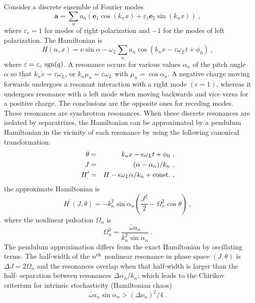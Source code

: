 \documentclass[12pt,a4paper]{article}
\renewcommand{\vec}[1]{\boldsymbol{#1}}
\begin{document}
Consider a discrete ensemble of Fourier modes
\begin{equation}
\vec{a} = \sum_n a_n(\vec{e}_1 \cos (k_n x) +\varepsilon_c \vec{e}_2 \sin(k_n x) ) ~,
\end{equation}
where $\varepsilon_c = 1$ for modes of right polarization and $-1$ for the modes of left polarization. The Hamiltonian is
\begin{equation}
H(\alpha, x) = \nu \sin \alpha -\omega_L \sum_n a_n \cos (k_n x -\varepsilon \omega_L t +\phi_0) ~,
\end{equation}
where $\varepsilon = \varepsilon_c ~{\rm sgn}(q)$. A resonance occurs for various values $\alpha_n$ of the pitch angle $\alpha$ so that $k_n \dot{x}  = \varepsilon \omega_L$, or $k_n \mu_n = \varepsilon \omega_L$ with $\mu_n = \cos \alpha_n$. A negative charge moving forwards undergoes a resonant interaction with a right mode $(\epsilon = 1)$, whereas it undergoes resonance with a left mode when moving backwards and vice versa for a positive charge. The conclusions are the opposite ones for receding modes. Those resonances are synchrotron resonances. When these discrete resonances are isolated by separatrixes, the Hamiltonian can be approximated by a pendulum Hamiltonian in the vicinity of each resonance by using the following canonical transformation:
\begin{eqnarray*}
\theta &=& k_n x -\epsilon \omega_L t +\phi_0 ~, \\
J &=& (\alpha -\alpha_n)/k_n ~, \\
H^\prime &=& H - \epsilon \omega_L \alpha /k_n +{\rm const.} ~,
\end{eqnarray*}
the approximate Hamiltonian is
\begin{equation}
H^\prime(J, \theta) = -k_n^2 \sin \alpha_n \left(\frac{J^2}{2} -\Omega^2_n \cos \theta \right) ~,
\end{equation}
where the nonlinear pulsation $\Omega_n$ is 
\begin{equation}
\Omega^2_n = \frac{\bar{\omega} a_n}{k^2_n \sin \alpha_n} ~.
\end{equation}
The pendulum approximation differs from the exact Hamiltonian by oscillating terms. The half-width of the $n^{\rm th}$ nonlinear resonance in phase space $(J, \theta)$ is $\Delta J = 2\Omega_n$ and the resonances overlap when that half-width is larger than the half- separation between resonances $\Delta \alpha_n/k_n$; which leads to the Chirikov criterium for intrinsic stochasticity (Hamiltonian chaos)
\begin{equation}
\bar{\omega} a_n \sin \alpha_n  > (\Delta \nu_n)^2/4 ~.
\end{equation}
\end{document}
